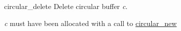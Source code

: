 \begin{DoxyDocu}{circular\_delete}
\label{circular_8h_a43f4274890d4b8368ffe2f8ca7d9471d_a43f4274890d4b8368ffe2f8ca7d9471d}
Delete circular buffer {\itshape c}.

{\itshape c} must have been allocated with a call to \hyperlink{circular_8h_a87c3cd901fa3ddae66945be3ae09d12d_a87c3cd901fa3ddae66945be3ae09d12d}{circular\_new}

\end{DoxyDocu}
